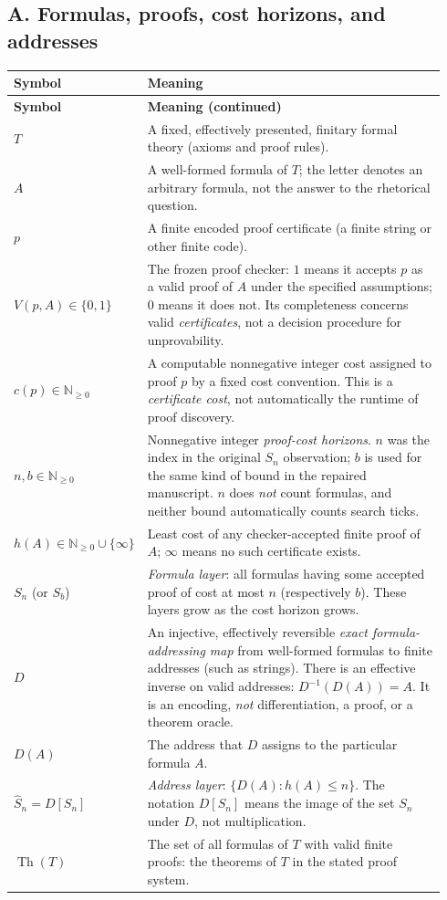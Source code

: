 \documentclass[11pt,letterpaper]{article}
\newcommand{\Th}{\operatorname{Th}}
\begin{document}
\subsection*{A. Formulas, proofs, cost horizons, and addresses}
{\small
\renewcommand{\arraystretch}{1.15}
\begin{longtable}{@{}p{0.245\linewidth}p{0.695\linewidth}@{}}
\toprule
\textbf{Symbol} & \textbf{Meaning}\\ \midrule
\endfirsthead
\toprule \textbf{Symbol} & \textbf{Meaning (continued)}\\ \midrule
\endhead
$T$ & A fixed, effectively presented, finitary formal theory (axioms and proof rules).\\
$A$ & A well-formed formula of $T$; the letter denotes an arbitrary formula, not the answer to the rhetorical question.\\
$p$ & A finite encoded proof certificate (a finite string or other finite code).\\
$V(p,A)\in\{0,1\}$ & The frozen proof checker: $1$ means it accepts $p$ as a valid proof of $A$ under the specified assumptions; $0$ means it does not. Its completeness concerns valid \emph{certificates}, not a decision procedure for unprovability.\\
$c(p)\in\mathbb N_{\ge0}$ & A computable nonnegative integer cost assigned to proof $p$ by a fixed cost convention. This is a \emph{certificate cost}, not automatically the runtime of proof discovery.\\
$n,b\in\mathbb N_{\ge0}$ & Nonnegative integer \emph{proof-cost horizons}. $n$ was the index in the original $S_n$ observation; $b$ is used for the same kind of bound in the repaired manuscript. $n$ does \emph{not} count formulas, and neither bound automatically counts search ticks.\\
$h(A)\in\mathbb N_{\ge0}\cup\{\infty\}$ & Least cost of any checker-accepted finite proof of $A$; $\infty$ means no such certificate exists.\\
$S_n$ (or $S_b$) & \emph{Formula layer}: all formulas having some accepted proof of cost at most $n$ (respectively $b$). These layers grow as the cost horizon grows.\\
$D$ & An injective, effectively reversible \emph{exact formula-addressing map} from well-formed formulas to finite addresses (such as strings). There is an effective inverse on valid addresses: $D^{-1}(D(A))=A$. It is an encoding, \emph{not} differentiation, a proof, or a theorem oracle.\\
$D(A)$ & The address that $D$ assigns to the particular formula $A$.\\
$\widehat S_n=D[S_n]$ & \emph{Address layer}: $\{D(A):h(A)\le n\}$. The notation $D[S_n]$ means the image of the set $S_n$ under $D$, not multiplication.\\
$\Th(T)$ & The set of all formulas of $T$ with valid finite proofs: the theorems of $T$ in the stated proof system.\\
\bottomrule
\end{longtable}
}
\end{document}
